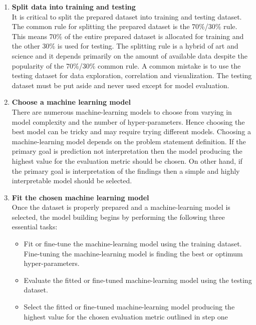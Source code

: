 \documentclass[12pt,a4paper,oneside]{book}
\begin{document}
\begin{enumerate}
\begin{itemize}
\end{itemize}

\item \textbf{Split data into training and testing }\\
It is critical to split the prepared dataset into training and testing dataset. The common rule for splitting the prepared dataset is the 70\%/30\% rule. This means 70\% of the entire prepared dataset is allocated for training and the other 30\% is used for testing. The splitting rule is a hybrid of art and science and it depends primarily on the amount of available data despite the popularity of the 70\%/30\% common rule. A common mistake is to use the testing dataset for data exploration, correlation and visualization. The testing dataset must be put aside and never used except for model evaluation.  
 
\item \textbf{Choose a machine learning model}\\
There are numerous machine-learning models to choose from varying in model complexity and the number of hyper-parameters. Hence choosing the best model can be tricky and may require trying different models. Choosing a machine-learning model depends on the problem statement definition. If the primary goal is prediction not interpretation then the model producing the highest value for the evaluation metric should be chosen. On other hand, if the primary goal is interpretation of the findings then a simple and highly interpretable model should be selected. 

\item \textbf{Fit the chosen machine learning model}\\
Once the dataset is properly prepared and a machine-learning model is selected, the model building begins by performing the following three essential tasks:

\begin{itemize}
\item Fit or fine-tune the machine-learning model using the training dataset. Fine-tuning the machine-learning model is finding the best or optimum hyper-parameters. 
\item Evaluate the fitted or fine-tuned machine-learning model using the testing dataset. 
\item Select the fitted or fine-tuned machine-learning model producing the highest value for the chosen evaluation metric outlined in step one
\end{itemize}
  


\end{enumerate}
\end{document}
